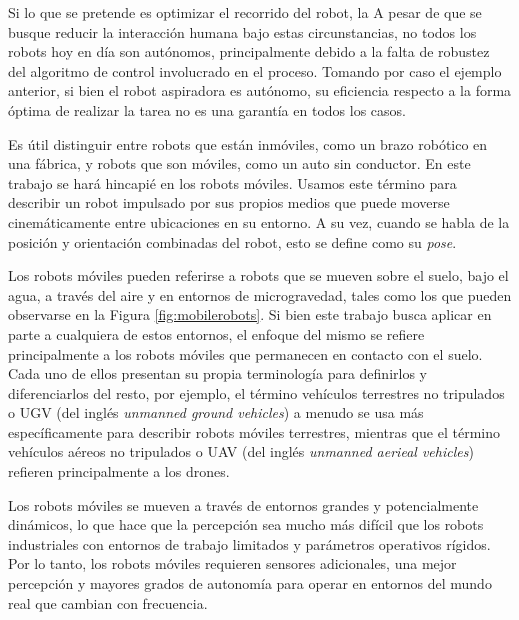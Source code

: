 \ifimagenes
Si lo que se pretende es optimizar el recorrido del robot, la
\else
A pesar de que se busque reducir la interacción humana bajo estas circunstancias, no todos los robots hoy en día son autónomos, principalmente debido a la falta de robustez del algoritmo de control involucrado en el proceso. Tomando por caso el ejemplo anterior, si bien el robot aspiradora es autónomo, su eficiencia respecto a la forma óptima de realizar la tarea no es una garantía en todos los casos.

Es útil distinguir entre robots que están inmóviles, como un brazo robótico en una fábrica, y robots que son móviles, como un auto sin conductor. En este trabajo se hará hincapié en los robots móviles. Usamos este término para describir un robot impulsado por sus propios medios que puede moverse cinemáticamente entre ubicaciones en su entorno. A su vez, cuando se habla de la posición y orientación combinadas del robot, esto se define como su \textit{pose}.

Los robots móviles pueden referirse a robots que se mueven sobre el suelo, bajo el agua, a través del aire y en entornos de microgravedad, tales como los que pueden observarse en la Figura \ref{fig:mobilerobots}. Si bien este trabajo busca aplicar en parte a cualquiera de estos entornos, el enfoque del mismo se refiere principalmente a los robots móviles que permanecen en contacto con el suelo. Cada uno de ellos presentan su propia terminología para definirlos y diferenciarlos del resto, por ejemplo, el término vehículos terrestres no tripulados o UGV (del inglés \textit{unmanned ground vehicles}) a menudo se usa más específicamente para describir robots móviles terrestres, mientras que el término vehículos aéreos no tripulados o UAV (del inglés \textit{unmanned aerieal vehicles}) refieren principalmente a los drones.

Los robots móviles se mueven a través de entornos grandes y potencialmente dinámicos, lo que hace que la percepción sea mucho más difícil que los robots industriales con entornos de trabajo limitados y parámetros operativos rígidos. Por lo tanto, los robots móviles requieren sensores adicionales, una mejor percepción y mayores grados de autonomía para operar en entornos del mundo real que cambian con frecuencia.


